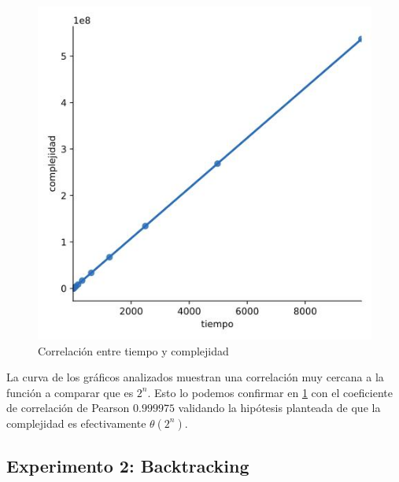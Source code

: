 \documentclass[10pt,a4paper]{article}
\begin{document}
\begin{figure}[h!]
	\centering
		\includegraphics[scale=0.35]{img/fb-correlacion.jpg}
		\caption{Correlación entre tiempo y complejidad}
		\label{fig:fb-correlacion}
\end{figure}
\newline
La curva de los gráficos analizados muestran una correlación muy cercana a la función a comparar que es $2^{n}$. Esto lo podemos confirmar en \ref{fig:fb-correlacion} con el
coeficiente de correlación de Pearson $0.999975$ validando la hipótesis planteada de que la complejidad es efectivamente $\theta(2^n)$.
\newpage
\subsection{Experimento 2: Backtracking}
\newpage
\end{document}
